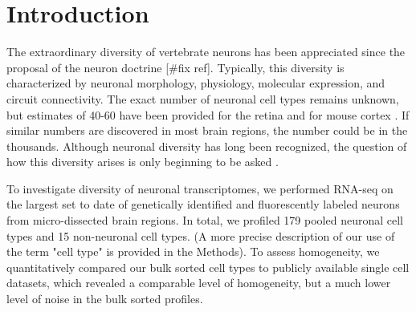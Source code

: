 \section*{Introduction}

The extraordinary diversity of vertebrate neurons has been appreciated since the proposal of the neuron doctrine \citep{Cajal_1888} [#fix ref]. Typically, this diversity is characterized by neuronal morphology, physiology, molecular expression, and circuit connectivity. The exact number of neuronal cell types remains unknown, but estimates of 40-60 have been provided for the retina \citep{Macosko_2015,Masland_2004} and for mouse cortex \citep{Tasic_2016,Zeisel_2015}. If similar numbers are discovered in most brain regions, the number could be in the thousands. Although neuronal diversity has long been recognized, the question of how this diversity arises is only beginning to be asked \citep{Arendt_2008,Muotri_2006}. 


To investigate diversity of neuronal transcriptomes, we performed RNA-seq on the largest set to date of genetically identified and fluorescently labeled neurons from micro-dissected brain regions. In total, we profiled 179 pooled neuronal cell types and 15 non-neuronal cell types. (A more precise description of our use of the term "cell type" is provided in the Methods). To assess  homogeneity, we quantitatively compared our bulk sorted cell types to publicly available single cell datasets, which revealed a comparable level of homogeneity, but a much lower level of noise in the bulk sorted profiles. 


